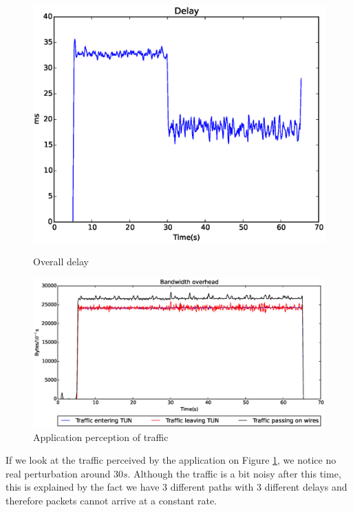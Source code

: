 \begin{figure}[!ht]
\centering
\begin{minipage}{0.4\linewidth}
\includegraphics[width=\textwidth]{images/xp/addint_delay.eps}
\caption{Overall delay}
\label{fig:xp-addint-delay}
\end{minipage}
\begin{minipage}{0.59\linewidth}
\includegraphics[width=\textwidth]{images/xp/addint_tun.eps}
\caption{Application perception of traffic}
\label{fig:xp-addint-tun}
\end{minipage}
\end{figure}

If we look at the traffic perceived by the application on Figure \ref{fig:xp-addint-tun}, we notice no real perturbation around $30s$. Although the traffic is a bit noisy after this time, this is explained by the fact we have 3 different paths with 3 different delays and therefore packets cannot arrive at a constant rate.

